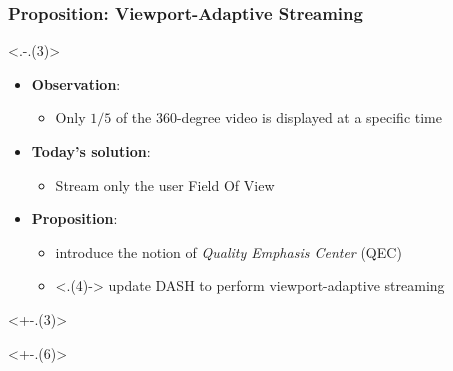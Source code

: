 \begin{frame}[c]
   \frametitle{Proposition: Viewport-Adaptive Streaming}

   \only<.-.(3)> {
   \begin{itemize}[<+->]
      \item \textbf{Observation}:
      \begin{itemize}[<.->]
         \item Only $1/5$ of the 360-degree video is displayed at a specific time
      \end{itemize}
      \item \textbf{Today's solution}:
      \begin{itemize}[<.->]
         \item Stream only the user Field Of View\\ 
      \end{itemize}
   \end{itemize}
   }
   \begin{itemize}[<+->]
      \item \textbf{Proposition}:
      \begin{itemize}[<.->]
         \item introduce the notion of \emph{Quality Emphasis Center} (QEC)
         \item<.(4)-> update DASH to perform viewport-adaptive streaming
      \end{itemize}
   \end{itemize}

   \begin{minipage}[t][7cm][t]{\textwidth}
      \only<+-.(3)> {
      \begin{independentCounter}
         
      \end{independentCounter}
      }
      \only<+-.(6)> {
         \begin{independentCounter}
            
         \end{independentCounter}
      }
   \end{minipage}

\end{frame}

